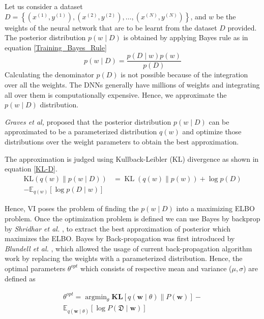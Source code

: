 \documentclass[10pt,twocolumn,letterpaper]{article}
\begin{document}
Let us consider a dataset $D=\left\{\left(x^{(1)}, y^{(1)}\right),\left(x^{(2)}, y^{(2)}\right), \ldots,\left(x^{(N)}, y^{(N)}\right)\right\}$, and $w$ be the weights of the neural network that are to be learnt from the dataset $D$ provided. The posterior distribution $p(w \mid D)$ is obtained by applying Bayes rule as in equation \ref{Training_Bayes_Rule}
    \begin{equation}
        \label{Training_Bayes_Rule}
        p(w \mid D)=\frac{p(D \mid w) p(w)}{p(D)}
    \end{equation}
Calculating the denominator $p(D)$ is not possible because of the integration over all the weights. The DNNs generally have millions of weights and integrating all over them is computationally expensive. Hence, we approximate the $p(w \mid D)$ distribution.

\textit{Graves et al,} \cite{Graves2011} proposed that the posterior distribution $p(w \mid D)$ can be approximated to be a parameterized distribution $q(w)$ and optimize those distributions over the weight parameters to obtain the best approximation.
        
The approximation is judged using Kullback-Leibler (KL) divergence \cite{Kullback1959} as shown in equation \ref{KL-D}.
    \begin{equation}
        \label{KL-D}
        \begin{aligned}
            \mathrm{KL}(q(w) \| p(w \mid D)) &=\operatorname{KL}(q(w) \| p(w))+\log p(D)\\ -\mathbb{E}_{q(w)}[\log p(D \mid w)]
        \end{aligned}
    \end{equation}

Hence, VI poses the problem of finding the $p(w \mid D)$ into a maximizing ELBO problem. Once the optimization problem is defined we can use Bayes by backprop by \textit{Shridhar et al.} \cite{shridhar2018uncertainty}, to extract the best approximation of posterior which maximizes the ELBO. Bayes by Back-propagation was first introduced by \textit{Blundell et al.} \cite{Blundell2015}, which allowed the usage of current back-propagation algorithm work by replacing the weights with a parameterized distribution. Hence, the optimal parameters $\theta^{opt}$ which consists of respective mean and variance ($\mu, \sigma$) are defined as  
        
\begin{equation}
\label{optim_param}
    \begin{aligned}
    \theta^{opt} =\operatorname{argmin}_{\theta} \mathbf{K L}[q(\mathbf{w} \mid \theta) \| P(\mathbf{w})]- \\ \mathbb{E}_{q(\mathbf{w} \mid \theta)}[\log P(\mathfrak{D} \mid \mathbf{w})]
    \end{aligned}
\end{equation}
\end{document}
